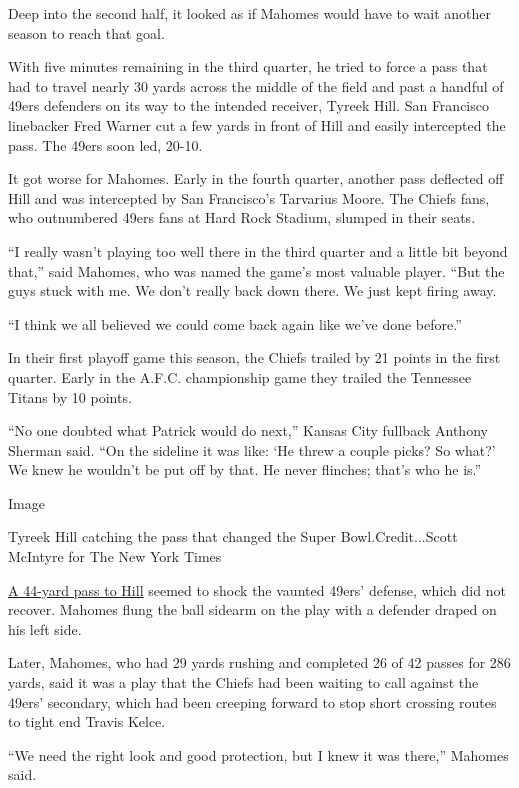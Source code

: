 Deep into the second half, it looked as if Mahomes would have to wait
another season to reach that goal.

With five minutes remaining in the third quarter, he tried to force a
pass that had to travel nearly 30 yards across the middle of the field
and past a handful of 49ers defenders on its way to the intended
receiver, Tyreek Hill. San Francisco linebacker Fred Warner cut a few
yards in front of Hill and easily intercepted the pass. The 49ers soon
led, 20-10.

It got worse for Mahomes. Early in the fourth quarter, another pass
deflected off Hill and was intercepted by San Francisco's Tarvarius
Moore. The Chiefs fans, who outnumbered 49ers fans at Hard Rock Stadium,
slumped in their seats.

``I really wasn't playing too well there in the third quarter and a
little bit beyond that,'' said Mahomes, who was named the game's most
valuable player. ``But the guys stuck with me. We don't really back down
there. We just kept firing away.

``I think we all believed we could come back again like we've done
before.''

In their first playoff game this season, the Chiefs trailed by 21 points
in the first quarter. Early in the A.F.C. championship game they trailed
the Tennessee Titans by 10 points.

``No one doubted what Patrick would do next,'' Kansas City fullback
Anthony Sherman said. ``On the sideline it was like: `He threw a couple
picks? So what?' We knew he wouldn't be put off by that. He never
flinches; that's who he is.''

Image

Tyreek Hill catching the pass that changed the Super Bowl.Credit...Scott
McIntyre for The New York Times

\href{https://www.nytimes3xbfgragh.onion/2020/02/02/sports/football/super-bowl-mahomes-big-play.html}{A
44-yard pass to Hill} seemed to shock the vaunted 49ers' defense, which
did not recover. Mahomes flung the ball sidearm on the play with a
defender draped on his left side.

Later, Mahomes, who had 29 yards rushing and completed 26 of 42 passes
for 286 yards, said it was a play that the Chiefs had been waiting to
call against the 49ers' secondary, which had been creeping forward to
stop short crossing routes to tight end Travis Kelce.

``We need the right look and good protection, but I knew it was there,''
Mahomes said.

